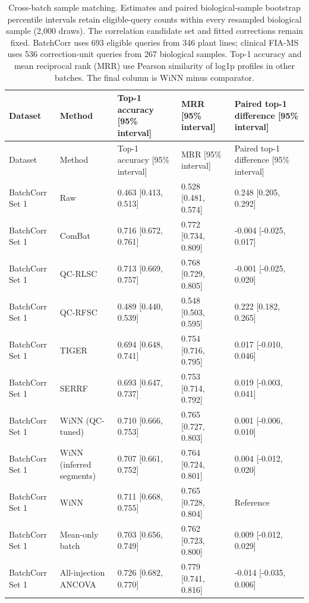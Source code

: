 \begin{landscape}
\footnotesize
\begin{longtable}{p{2.7cm}p{3.4cm}p{4.3cm}p{4.3cm}p{4.8cm}}
\caption{Cross-batch sample matching. Estimates and paired biological-sample bootstrap percentile intervals retain eligible-query counts within every resampled biological sample (2,000 draws). The correlation candidate set and fitted corrections remain fixed. BatchCorr uses 693 eligible queries from 346 plant lines; clinical FIA-MS uses 536 correction-unit queries from 267 biological samples. Top-1 accuracy and mean reciprocal rank (MRR) use Pearson similarity of log1p profiles in other batches. The final column is WiNN minus comparator.}\label{tab:supp_identity_retrieval}\\
\toprule
Dataset & Method & Top-1 accuracy [95\% interval] & MRR [95\% interval] & Paired top-1 difference [95\% interval] \\
\midrule
\endfirsthead
\toprule
Dataset & Method & Top-1 accuracy [95\% interval] & MRR [95\% interval] & Paired top-1 difference [95\% interval] \\
\midrule
\endhead
\bottomrule
\endlastfoot
BatchCorr Set 1 & Raw & 0.463 [0.413, 0.513] & 0.528 [0.481, 0.574] & 0.248 [0.205, 0.292] \\
BatchCorr Set 1 & ComBat & 0.716 [0.672, 0.761] & 0.772 [0.734, 0.809] & -0.004 [-0.025, 0.017] \\
BatchCorr Set 1 & QC-RLSC & 0.713 [0.669, 0.757] & 0.768 [0.729, 0.805] & -0.001 [-0.025, 0.020] \\
BatchCorr Set 1 & QC-RFSC & 0.489 [0.440, 0.539] & 0.548 [0.503, 0.595] & 0.222 [0.182, 0.265] \\
BatchCorr Set 1 & TIGER & 0.694 [0.648, 0.741] & 0.754 [0.716, 0.795] & 0.017 [-0.010, 0.046] \\
BatchCorr Set 1 & SERRF & 0.693 [0.647, 0.737] & 0.753 [0.714, 0.792] & 0.019 [-0.003, 0.041] \\
BatchCorr Set 1 & WiNN (QC-tuned) & 0.710 [0.666, 0.753] & 0.765 [0.727, 0.803] & 0.001 [-0.006, 0.010] \\
BatchCorr Set 1 & WiNN (inferred segments) & 0.707 [0.661, 0.752] & 0.764 [0.724, 0.801] & 0.004 [-0.012, 0.020] \\
BatchCorr Set 1 & WiNN & 0.711 [0.668, 0.755] & 0.765 [0.728, 0.804] & Reference \\
BatchCorr Set 1 & Mean-only batch & 0.703 [0.656, 0.749] & 0.762 [0.723, 0.800] & 0.009 [-0.012, 0.029] \\
BatchCorr Set 1 & All-injection ANCOVA & 0.726 [0.682, 0.770] & 0.779 [0.741, 0.816] & -0.014 [-0.035, 0.006] \\

\end{longtable}
\end{landscape}
